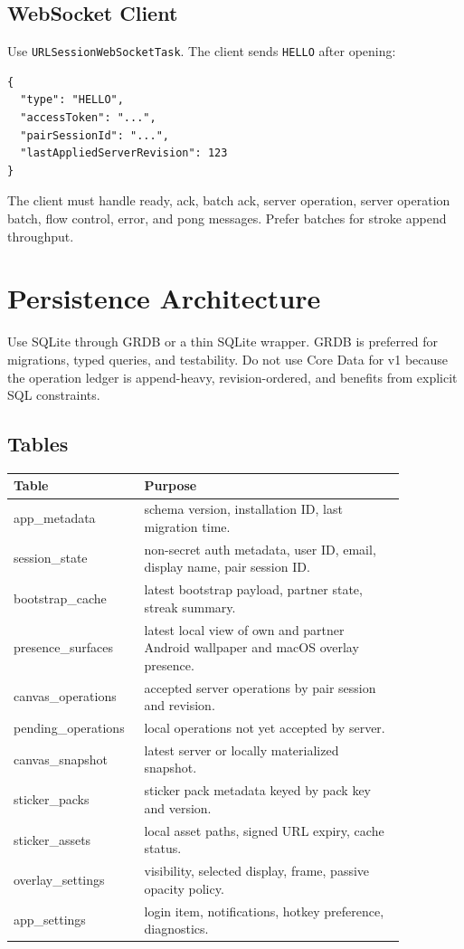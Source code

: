 \documentclass[11pt]{article}
\begin{document}
\subsection{WebSocket Client}

Use \texttt{URLSessionWebSocketTask}. The client sends \texttt{HELLO} after opening:
\begin{verbatim}
{
  "type": "HELLO",
  "accessToken": "...",
  "pairSessionId": "...",
  "lastAppliedServerRevision": 123
}
\end{verbatim}

The client must handle ready, ack, batch ack, server operation, server operation batch, flow control, error, and pong messages. Prefer batches for stroke append throughput.

\section{Persistence Architecture}

Use SQLite through GRDB or a thin SQLite wrapper. GRDB is preferred for migrations, typed queries, and testability. Do not use Core Data for v1 because the operation ledger is append-heavy, revision-ordered, and benefits from explicit SQL constraints.

\subsection{Tables}

\begin{longtable}{p{0.24\linewidth} p{0.62\linewidth}}
\toprule
\textbf{Table} & \textbf{Purpose} \\
\midrule
app\_metadata & schema version, installation ID, last migration time. \\
session\_state & non-secret auth metadata, user ID, email, display name, pair session ID. \\
bootstrap\_cache & latest bootstrap payload, partner state, streak summary. \\
presence\_surfaces & latest local view of own and partner Android wallpaper and macOS overlay presence. \\
canvas\_operations & accepted server operations by pair session and revision. \\
pending\_operations & local operations not yet accepted by server. \\
canvas\_snapshot & latest server or locally materialized snapshot. \\
sticker\_packs & sticker pack metadata keyed by pack key and version. \\
sticker\_assets & local asset paths, signed URL expiry, cache status. \\
overlay\_settings & visibility, selected display, frame, passive opacity policy. \\
app\_settings & login item, notifications, hotkey preference, diagnostics. \\
\bottomrule
\end{longtable}
\end{document}
